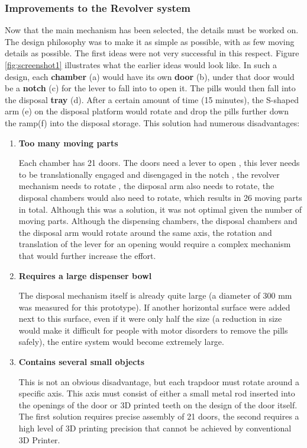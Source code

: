 \subsubsection{Improvements to the Revolver system}
Now that the main mechanism has been selected, the details must be worked on. The design philosophy was to make it as simple as possible, with as few moving details as possible. The first ideas were not very successful in this respect. Figure \ref{fig:screenshot1} illustrates what the earlier ideas would look like. In such a design, each \textbf{chamber} (a) would have its own \textbf{door} (b), under that door would be a \textbf{notch} (c) for the lever to fall into to open it. The pills would then fall into the disposal \textbf{tray} (d). After a certain amount of time (15 minutes), the S-shaped arm (e) on the disposal platform would rotate and drop the pills further down the ramp(f) into the disposal storage. This solution had numerous disadvantages:
\begin{enumerate}
	\item{\textbf{Too many moving parts}}
	
	Each chamber has 21 doors. The doors need a lever to open , this lever needs to be translationally engaged and disengaged in the notch , the revolver mechanism needs to rotate , the disposal arm also needs to rotate, the disposal chambers would also need to rotate, which results in 26 moving parts in total. Although this was a solution, it was not optimal given the number of moving parts. Although the dispensing chambers, the disposal chambers and the disposal arm would rotate around the same axis, the rotation and translation of the lever for an opening would require a complex mechanism that would further increase the effort.
	\item{\textbf{Requires a large dispenser bowl}}
	
	The disposal mechanism itself is already quite large (a diameter of 300 mm was measured for this prototype). If another horizontal surface were added next to this surface, even if it were only half the size (a reduction in size would make it difficult for people with motor disorders to remove the pills safely), the entire system would become extremely large.
	\item{\textbf{Contains several small objects}}
	
	This is not an obvious disadvantage, but each trapdoor must rotate around a specific axis. This axis must consist of either a small metal rod inserted into the openings of the door or 3D printed teeth on the design of the door itself. The first solution requires precise assembly of 21 doors, the second requires a high level of 3D printing precision that cannot be achieved by conventional 3D Printer.
\end{enumerate}

